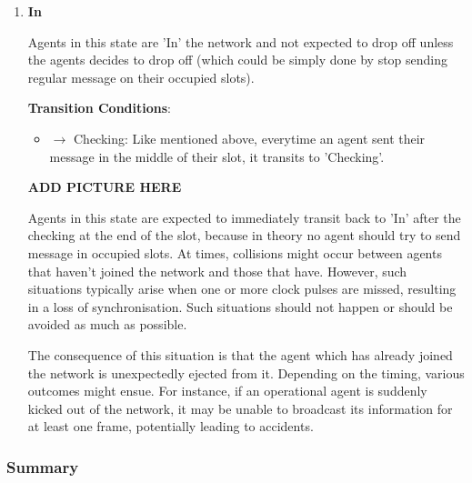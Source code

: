 {\begin{enumerate}
    \textbf{Reminder about Collision}:

    Within the framework of this algorithm, the only potential collision between agents occurs when multiple agents happen to select the same free slot for occupation while 'Listening' and attempted to occupy that slot while 'Entering'.  

    In this situation, agent recognises the collision and reverse to 'Listening'.

    \item \textbf{In}
    
    Agents in this state are 'In' the network and not expected to drop off unless the agents decides to drop off (which could be simply done by stop sending regular message on their occupied slots). 

    \textbf{Transition Conditions}:

    \begin{itemize}
        \item $\rightarrow$ Checking: Like mentioned above, everytime an agent sent their message in the middle of their slot, it transits to 'Checking'.
    \end{itemize}

    \textbf{ADD PICTURE HERE} %

    Agents in this state are expected to immediately transit back to 'In' after the checking at the end of the slot, because in theory no agent should try to send message in occupied slots.
    At times, collisions might occur between agents that haven't joined the network and those that have. However, such situations typically arise when one or more clock pulses are missed, resulting in a loss of synchronisation. Such situations should not happen or should be avoided as much as possible.

    The consequence of this situation is that the agent which has already joined the network is unexpectedly ejected from it. 
    Depending on the timing, various outcomes might ensue. For instance, if an operational agent is suddenly kicked out of the network, it may be unable to broadcast its information for at least one frame, potentially leading to accidents.

\end{enumerate}

\subsubsection{Summary}

}
